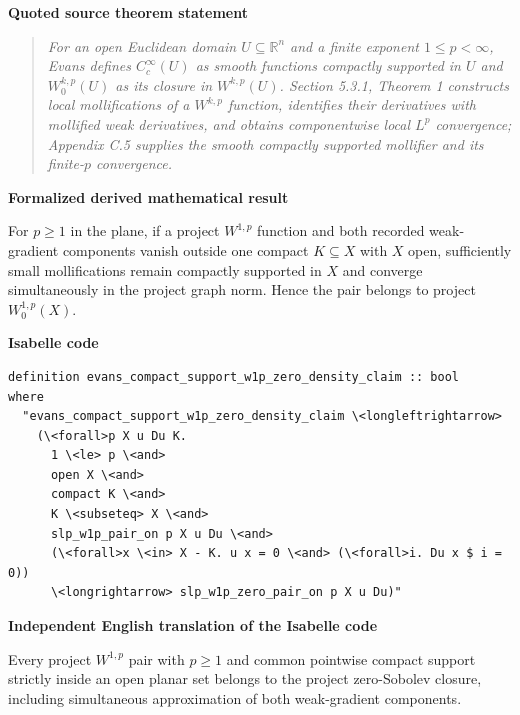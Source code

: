 \documentclass[10pt,oneside]{article}
\newenvironment{sourcequote}{\begin{quote}\itshape}{\end{quote}}
\newcommand{\reviewlabel}[1]{\par\smallskip\noindent\textsf{\bfseries #1}\par\smallskip}
\begin{document}
\reviewlabel{Quoted source theorem statement}
\begin{sourcequote}
For an open Euclidean domain $U\subseteq\mathbb R^n$ and a finite exponent $1\leq p<\infty$, Evans defines $C_c^\infty(U)$ as smooth functions compactly supported in $U$ and $W_0^{k,p}(U)$ as its closure in $W^{k,p}(U)$. Section 5.3.1, Theorem 1 constructs local mollifications of a $W^{k,p}$ function, identifies their derivatives with mollified weak derivatives, and obtains componentwise local $L^p$ convergence; Appendix C.5 supplies the smooth compactly supported mollifier and its finite-$p$ convergence.
\end{sourcequote}

\reviewlabel{Formalized derived mathematical result}
For $p\geq1$ in the plane, if a project $W^{1,p}$ function and both recorded weak-gradient components vanish outside one compact $K\subseteq X$ with $X$ open, sufficiently small mollifications remain compactly supported in $X$ and converge simultaneously in the project graph norm. Hence the pair belongs to project $W^{1,p}_0(X)$.

\reviewlabel{Isabelle code}
\begin{lstlisting}
definition evans_compact_support_w1p_zero_density_claim :: bool
where
  "evans_compact_support_w1p_zero_density_claim \<longleftrightarrow>
    (\<forall>p X u Du K.
      1 \<le> p \<and>
      open X \<and>
      compact K \<and>
      K \<subseteq> X \<and>
      slp_w1p_pair_on p X u Du \<and>
      (\<forall>x \<in> X - K. u x = 0 \<and> (\<forall>i. Du x $ i = 0))
      \<longrightarrow> slp_w1p_zero_pair_on p X u Du)"
\end{lstlisting}

\reviewlabel{Independent English translation of the Isabelle code}
Every project $W^{1,p}$ pair with $p\geq1$ and common pointwise compact support strictly inside an open planar set belongs to the project zero-Sobolev closure, including simultaneous approximation of both weak-gradient components.
\end{document}
